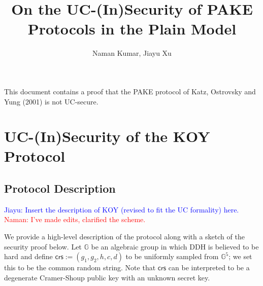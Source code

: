 \documentclass[10pt,a4paper]{article}
\title{\textbf{On the UC-(In)Security of PAKE Protocols in the Plain Model}}
\author{Naman Kumar, Jiayu Xu}
\newcommand{\crs}{\mathsf{crs}}
\newcommand{\G}{\mathbb{G}}
\def\xjy#1{\textcolor{blue}{Jiayu: #1}}
\def\nam#1{\textcolor{red}{Naman: #1}}
\begin{document}
	\maketitle
	
	This document contains a proof that the PAKE protocol of Katz, Ostrovsky and Yung (2001) is not UC-secure.

\section{UC-(In)Security of the KOY Protocol}
\subsection{Protocol Description}
\xjy{Insert the description of KOY (revised to fit the UC formality) here.} \nam{I've made edits, clarified the scheme.}

We provide a high-level description of the protocol along with a sketch of the security proof below. Let $\G$ be an algebraic group in which DDH is believed to be hard and define $\crs := (g_1, g_2, h, c, d)$ to be uniformly sampled from $\G^5$; we set this to be the common random string. Note that $\crs$ can be interpreted to be a degenerate Cramer-Shoup public key with an unknown secret key.
\end{document}
